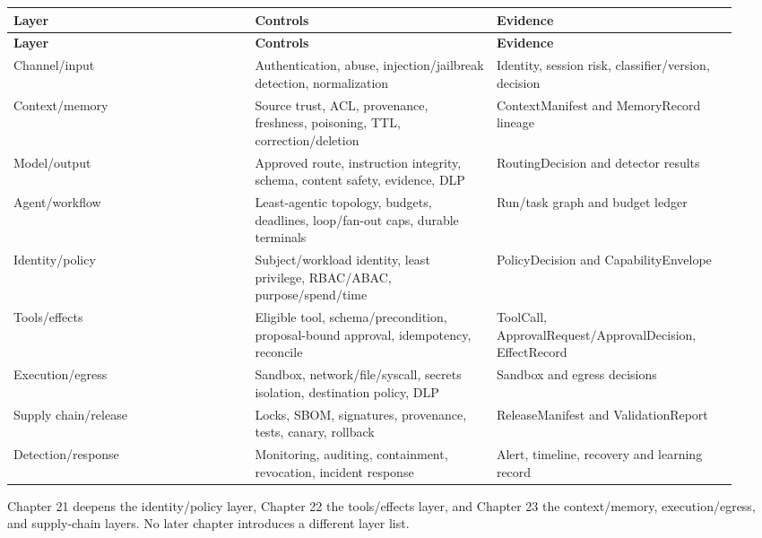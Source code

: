 \BookTableStart
\small
\begin{longtable}{@{}Y{0.3133\linewidth}Y{0.3133\linewidth}Y{0.3133\linewidth}@{}}
\color{white}\bfseries \textbf{Layer} & \color{white}\bfseries \textbf{Controls} & \color{white}\bfseries \textbf{Evidence} \\
\endfirsthead
{}
\color{white}\bfseries \textbf{Layer} & \color{white}\bfseries \textbf{Controls} & \color{white}\bfseries \textbf{Evidence} \\
\endhead
Channel/input & Authentication, abuse, injection/jailbreak detection, normalization & Identity, session risk, classifier/version, decision \\
Context/memory & Source trust, ACL, provenance, freshness, poisoning, TTL, correction/deletion & ContextManifest and MemoryRecord lineage \\
Model/output & Approved route, instruction integrity, schema, content safety, evidence, DLP & RoutingDecision and detector results \\
Agent/workflow & Least-agentic topology, budgets, deadlines, loop/fan-out caps, durable terminals & Run/task graph and budget ledger \\
Identity/policy & Subject/workload identity, least privilege, RBAC/ABAC, purpose/spend/time & PolicyDecision and CapabilityEnvelope \\
Tools/effects & Eligible tool, schema/precondition, proposal-bound approval, idempotency, reconcile & ToolCall, ApprovalRequest/ApprovalDecision, EffectRecord \\
Execution/egress & Sandbox, network/file/syscall, secrets isolation, destination policy, DLP & Sandbox and egress decisions \\
Supply chain/release & Locks, SBOM, signatures, provenance, tests, canary, rollback & ReleaseManifest and ValidationReport \\
Detection/response & Monitoring, auditing, containment, revocation, incident response & Alert, timeline, recovery and learning record \\
\end{longtable}
\BookTableEnd

Chapter 21 deepens the identity/policy layer, Chapter 22 the tools/effects layer, and Chapter 23 the context/memory, execution/egress, and supply-chain layers. No later chapter introduces a different layer list.\par

